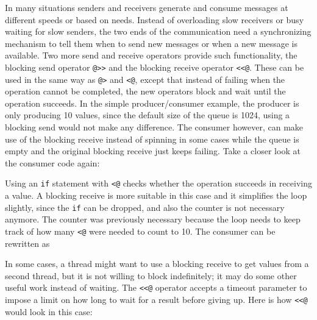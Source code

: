 In many situations senders and receivers generate and consume messages at
different speeds or based on needs. Instead of overloading slow receivers or
busy waiting for slow senders, the two ends of the communication need a
synchronizing mechanism to tell them when to send new messages or when a new
message is available. Two more send and receive operators provide such
functionality, the blocking send operator \texttt{@>{}>} and the blocking
receive operator \texttt{<{}<@}.  These can be used in the same way as
\texttt{@>} and \texttt{{<}@}, except that instead of failing when the operation
cannot be completed, the new operators block and wait until the operation
succeeds. In the simple producer/consumer example, the producer is only
producing 10 values, since the default size of the queue is 1024, using a
blocking send would not make any difference. The consumer however, can make use
of the blocking receive instead of spinning in some cases while the queue is
empty and the original blocking receive just keeps failing.  Take a closer look
at the consumer code again:


Using an \texttt{if} statement with \texttt{{<}@} checks whether the operation
succeeds in receiving a value. A blocking receive is more suitable in this case
and it simplifies the loop slightly, since the \texttt{if} can be dropped, and
also the counter is not necessary anymore. The counter was previously necessary
because the loop needs to keep track of how many \texttt{{<}@} were needed to
count to 10. The consumer can be rewritten as


In some cases, a thread might want to use a blocking receive to get values from
a second thread, but it is not willing to block indefinitely; it may do some
other useful work instead of waiting. The \texttt{<{}<@} operator accepts a
timeout parameter to impose a limit on how long to wait for a result before
giving up. Here is how \texttt{<{}<@} would look in this case:

